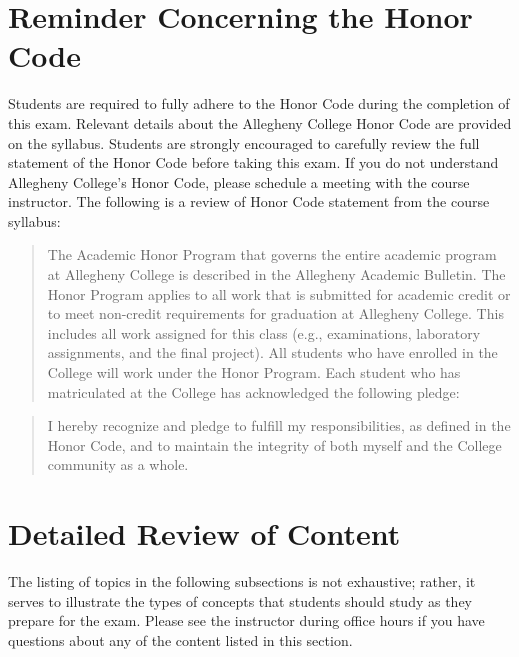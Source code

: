\documentclass[11pt]{article}
\begin{document}
\section*{Reminder Concerning the Honor Code}

\noindent Students are required to fully adhere to the Honor Code during the
completion of this exam. Relevant details about the Allegheny College Honor Code
are provided on the syllabus. Students are strongly encouraged to carefully
review the full statement of the Honor Code before taking this exam. If you do
not understand Allegheny College's Honor Code, please schedule a meeting with
the course instructor. The following is a review of Honor Code statement from
the course syllabus:

\vspace*{-.05in}

\begin{quote}
The Academic Honor Program that governs the entire academic program at
Allegheny College is described in the Allegheny Academic Bulletin. The Honor
Program applies to all work that is submitted for academic credit or to meet
non-credit requirements for graduation at Allegheny College. This includes all
work assigned for this class (e.g., examinations, laboratory assignments, and
the final project). All students who have enrolled in the College will work
under the Honor Program.  Each student who has matriculated at the College has
acknowledged the following pledge:
\end{quote}

\vspace*{-.2in}

\begin{quote}
%
  I hereby recognize and pledge to fulfill my responsibilities, as defined in
  the Honor Code, and to maintain the integrity of both myself and the College
  community as a whole.
%
\end{quote}

\vspace*{-.1in}

\section*{Detailed Review of Content}

The listing of topics in the following subsections is not exhaustive; rather, it
serves to illustrate the types of concepts that students should study as they
prepare for the exam. Please see the instructor during office hours if you have
questions about any of the content listed in this section.
\end{document}
